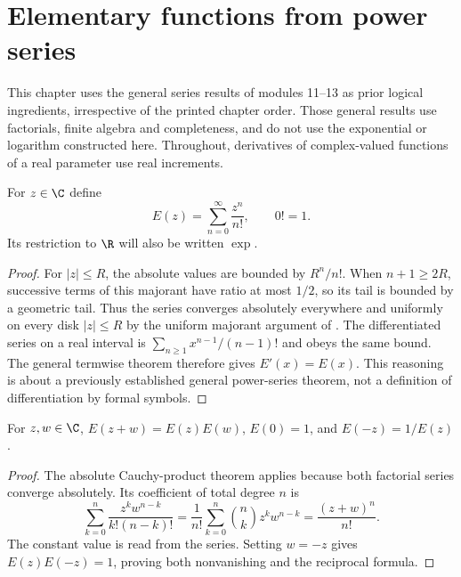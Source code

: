 \chapter{Elementary functions from power series}
This chapter uses the general series results of modules 11--13 as prior logical
ingredients, irrespective of the printed chapter order. Those general results
use factorials, finite algebra and completeness, and do not use the exponential
or logarithm constructed here. Throughout, derivatives of complex-valued
functions of a real parameter use real increments.

\begin{construction}
For $z\in\C$ define
\[E(z)=\sum_{n=0}^{\infty}\frac{z^n}{n!},\qquad 0!=1.
\]
Its restriction to $\R$ will also be written $\exp$.
\end{construction}
\begin{proof}
For $|z|\le R$, the absolute values are bounded by $R^n/n!$.
When $n+1\ge2R$, successive terms of this majorant have ratio at most
$1/2$, so its tail is bounded by a geometric tail. Thus the series converges
absolutely everywhere and uniformly on every disk $|z|\le R$ by the
uniform majorant argument of . The differentiated
series on a real interval is $\sum_{n\ge1}x^{n-1}/(n-1)!$ and obeys the
same bound. The general termwise theorem  therefore
gives $E'(x)=E(x)$. This reasoning is about a previously established general
power-series theorem, not a definition of differentiation by formal symbols.
\end{proof}

\begin{theorem}
For $z,w\in\C$, $E(z+w)=E(z)E(w)$, $E(0)=1$, and
$E(-z)=1/E(z)$.
\end{theorem}
\begin{proof}
The absolute Cauchy-product theorem  applies
because both factorial series converge absolutely. Its coefficient of total
degree $n$ is
\[\sum_{k=0}^n\frac{z^kw^{n-k}}{k!(n-k)!}
=\frac1{n!}\sum_{k=0}^n\binom nkz^kw^{n-k}
=\frac{(z+w)^n}{n!}.
\]
The constant value is read from the series. Setting $w=-z$ gives
$E(z)E(-z)=1$, proving both nonvanishing and the reciprocal formula.
\end{proof}

